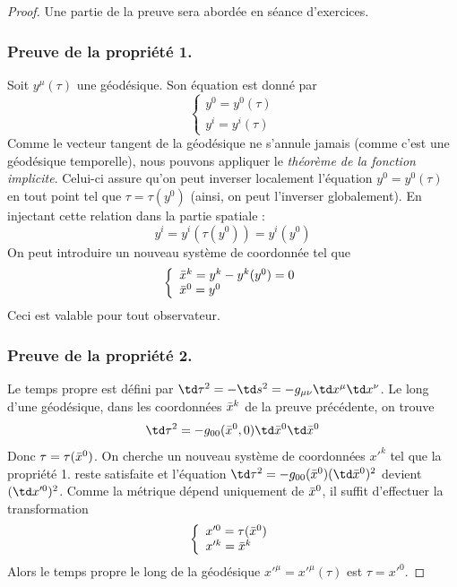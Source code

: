\begin{proof}
    Une partie de la preuve sera abordée en séance d'exercices.
    \subsubsection{Preuve de la propriété 1.}
    Soit $y^{\mu}(\tau)$ une géodésique. Son équation est donné par 
    \begin{equation}
        \left\{
        \begin{array}{l}
            y^0 = y^0(\tau)\\
            y^{i} = y^{i}(\tau)
        \end{array}
        \right.
    \end{equation}
    Comme le vecteur tangent de la géodésique ne s'annule jamais (comme c'est une géodésique temporelle), nous pouvons appliquer le \emph{théorème de la fonction implicite}. Celui-ci assure qu'on peut inverser localement l'équation $y^0 = y^0(\tau)$ en tout point tel que $\tau = \tau(y^0)$ (ainsi, on peut l'inverser globalement). En injectant cette relation dans la partie spatiale : 
    \begin{equation}
        y^{i} = y^{i}(\tau(y^0)) = y^{i}(y^0)
    \end{equation}
    On peut introduire un nouveau système de coordonnée tel que
    \begin{equation}
        \left\{
        \begin{array}{l}
            \Bar{x}^k = y^k - y^k(y^0)=0\\
            \Bar{x}^0 = y^0
        \end{array}
        \right.
    \end{equation}
    Ceci est valable pour tout observateur.

    \subsubsection{Preuve de la propriété 2.}
    Le temps propre est défini par $\td \tau ^2 = -\td s^2 = -g_{\mu \nu}\td x^{\mu} \td x^{\nu}$. Le long d'une géodésique, dans les coordonnées $\Bar{x}^k$ de la preuve précédente, on trouve
    \begin{equation}
        \td \tau ^2 = -g_{0 0}(\Bar{x}^0, 0)\td \Bar{x}^{0} \td \Bar{x}^{0}
    \end{equation}
    Donc $\tau = \tau(\Bar{x}^0)$. On cherche un nouveau système de coordonnées $x'^k$ tel que la propriété 1. reste satisfaite et l'équation $\td \tau^2 = - g_{00}(\Bar{x}^0)(\td \Bar{x}^0)^2$ devient $(\td x'^0)^2$. Comme la métrique dépend uniquement de $\Bar{x}^0$, il suffit d'effectuer la transformation
    \begin{equation}
        \left\{
        \begin{array}{l}
            x'^0 = \tau(\Bar{x}^0)\\
            x'^k = \Bar{x}^k
        \end{array}
        \right.
    \end{equation}
    Alors le temps propre le long de la géodésique $x'^{\mu} = x'^{\mu}(\tau)$ est $\tau = x'^{0}$.


\end{proof}
